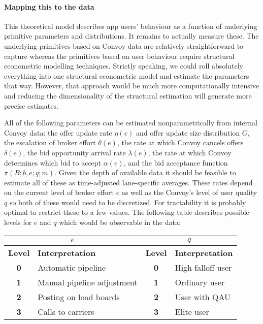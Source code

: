 \documentclass[12pt]{article}
\begin{document}
\paragraph{Mapping this to the data}
This theoretical model describes app users' behaviour as a function of underlying primitive parameters and distributions. It remains to actually measure these. The underlying primitives based on Convoy data are relatively straightforward to capture whereas the primitives based on user behaviour require structural econometric modelling techniques. Strictly speaking, we could roll absolutely everything into one structural econometric model and estimate the parameters that way. However, that approach would be much more computationally intensive and reducing the dimensionality of the structural estimation will generate more precise estimates.

All of the following parameters can be estimated nonparametrically from internal Convoy data: the offer update rate $\eta\left(e\right)$ and offer update size distribution $G$, the escalation of broker effort $\theta\left(e\right)$, the rate at which Convoy cancels offers $\delta\left(e\right)$, the bid opportunity arrival rate $\lambda\left(e\right)$, the rate at which Convoy determines which bid to accept $\alpha\left(e\right)$, and the bid acceptance function $ \pi\left(B; b, e; q; m \right)$. Given the depth of available data it should be feasible to estimate all of these as time-adjusted lane-specific averages. These rates depend on the current level of broker effort $e$ as well as the Convoy's level of user quality $q$ so both of these would need to be discretized. For tractability it is probably optimal to restrict these to a few values. The following table describes possible levels for $e$ and $q$ which would be observable in the data: 
\begin{table}[htp]
\centering
\begin{tabular}{cl@{\hskip 36pt}cl}
\hline
\multicolumn{2}{c}{$e$}   &                           \multicolumn{2}{c}{$q$}                    \\
\hline
\textbf{Level} & \textbf{Interpretation}             & \textbf{Level} & \textbf{Interpretation}    \\
\hline
\textbf{0}     & Automatic pipeline         & \textbf{0}     & High falloff user \\
\textbf{1}     & Manual pipeline adjustment & \textbf{1}     & Ordinary user     \\
\textbf{2}     & Posting on load boards     & \textbf{2}     & User with QAU     \\
\textbf{3}     & Calls to carriers          & \textbf{3}     & Elite user       
\end{tabular}
\end{table}
\end{document}
